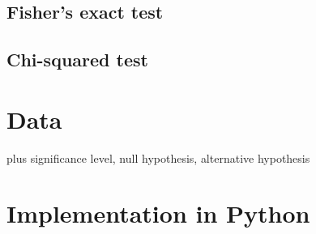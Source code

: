 \subsection{Fisher's exact test}

\subsection{Chi-squared test}




\section{Data}
plus significance level, null hypothesis, alternative hypothesis


\section{Implementation in Python}



